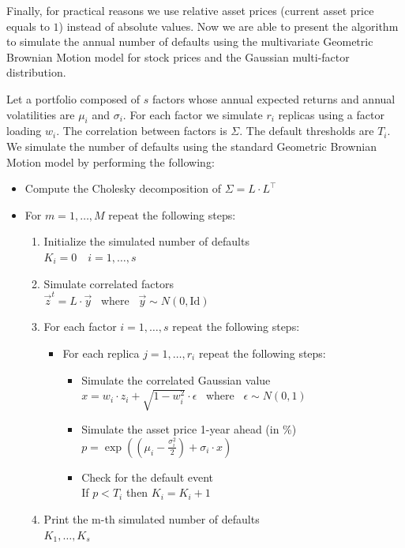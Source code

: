 \documentclass[11pt,fleqn]{book} %
\begin{document}
Finally, for practical reasons we use relative asset prices (current asset price 
equals to $1$) instead of absolute values. Now we are able to present the algorithm
to simulate the annual number of defaults using the multivariate Geometric Brownian 
Motion model for stock prices and the Gaussian multi-factor distribution.

\begin{algorithm}
	\label{alg:sdumm}
	Let a portfolio composed of $s$ factors whose annual expected returns and 
	annual volatilities are $\mu_i$ and $\sigma_i$. For each factor we simulate 
	$r_i$ replicas using a factor loading $w_i$. The correlation between factors 
	is $\Sigma$. The default thresholds are $T_i$.
	We simulate the number of defaults using the standard Geometric Brownian 
	Motion model by performing the following:
	\begin{itemize}
		\item Compute the Cholesky decomposition of $\Sigma = L \cdot L^\intercal$
		\item For $m=1,\dots,M$ repeat the following steps:
		\begin{enumerate}
			\item Initialize the simulated number of defaults \\ 
			$K_i=0 \quad i=1,\dots,s$
			\item Simulate correlated factors \\
			$\vec{z}^t = L \cdot \vec{y}$ ~where~ $\vec{y} \sim N(0,\text{Id})$
			\item For each factor $i=1,\dots,s$ repeat the following steps:
			\begin{itemize}
				\item For each replica $j=1,\dots,r_i$ repeat the following steps:
				\begin{itemize}
					\item Simulate the correlated Gaussian value \\
					$x = w_i \cdot z_i + \sqrt{1-w_i^2} \cdot \epsilon$ ~where~ $\epsilon \sim N(0,1)$
					\item Simulate the asset price 1-year ahead (in \%)\\
					$p = \exp\left(\left(\mu_i - \frac{\sigma_i^2}{2}\right) + \sigma_i \cdot x\right)$
					\item Check for the default event \\
					If $p < T_i$ then $K_i = K_i + 1$
				\end{itemize}
			\end{itemize}
			\item Print the m-th simulated number of defaults \\
			$K_1,\dots,K_s$
		\end{enumerate}
	\end{itemize}
\end{algorithm}
\end{document}
